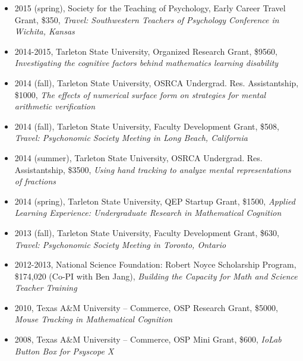 \documentclass[article,10pt]{article}
\begin{document}
\begin{itemize}
\item 2015 (spring), Society for the Teaching of Psychology, Early Career Travel Grant, \$350, \emph{Travel: Southwestern Teachers of Psychology Conference in Wichita, Kansas}
\item 2014-2015, Tarleton State University, Organized Research Grant, \$9560, \emph{Investigating the cognitive factors behind mathematics learning disability}
\item 2014 (fall), Tarleton State University, OSRCA Undergrad. Res. Assistantship, \$1000, \emph{The effects of numerical surface form on strategies for mental arithmetic verification}
\item 2014 (fall), Tarleton State University, Faculty Development Grant, \$508, \emph{Travel: Psychonomic Society Meeting in Long Beach, California}
\item 2014 (summer), Tarleton State University, OSRCA Undergrad. Res. Assistantship, \$3500, \emph{Using hand tracking to analyze mental representations of fractions}
\item 2014 (spring), Tarleton State University, QEP Startup Grant, \$1500, \emph{Applied Learning Experience: Undergraduate Research in Mathematical Cognition}
\item 2013 (fall), Tarleton State University, Faculty Development Grant, \$630, \emph{Travel: Psychonomic Society Meeting in Toronto, Ontario}
\item 2012-2013, National Science Foundation: Robert Noyce Scholarship Program, \$174,020 (Co-PI with Ben Jang), \emph{Building the Capacity for Math and Science Teacher Training}
\item 2010, Texas A\&M University – Commerce, OSP Research Grant, \$5000, \emph{Mouse Tracking in Mathematical Cognition}
\item 2008, Texas A\&M University – Commerce, OSP Mini Grant, \$600, \emph{IoLab Button Box for Psyscope X}
\end{itemize}
\end{document}
